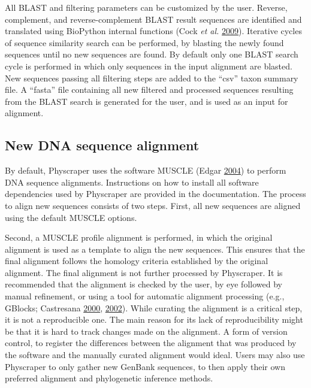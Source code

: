 \documentclass[]{article}
\begin{document}
All BLAST and filtering parameters can be customized by the user.
Reverse, complement, and reverse-complement BLAST result sequences are identified and translated using BioPython internal functions (Cock \emph{et al.} \protect\hyperlink{ref-cock2009biopython}{2009}).
Iterative cycles of sequence similarity search can be performed, by blasting the newly found sequences until no new sequences are found. By default only one BLAST search cycle is performed in which only sequences in the input alignment are blasted.
New sequences passing all filtering steps are added to the ``csv'' taxon summary file.
A ``fasta'' file containing all new filtered and processed sequences resulting from the BLAST search is generated for the user, and is used as an input for alignment.

\hypertarget{new-dna-sequence-alignment}{%
\subsection{New DNA sequence alignment}\label{new-dna-sequence-alignment}}

By default, Physcraper uses the software MUSCLE (Edgar \protect\hyperlink{ref-edgar2004muscle}{2004}) to perform DNA sequence alignments. Instructions on how to install all software dependencies used by Physcraper are provided in the documentation.
The process to align new sequences consists of two steps. First, all new sequences are aligned using the default MUSCLE options.

Second, a MUSCLE profile alignment is performed, in which the original alignment
is used as a template to align the new sequences. This ensures that the final alignment
follows the homology criteria established by the original alignment.
The final alignment is not further processed by Physcraper. It is recommended that the alignment is checked by the user, by eye followed by manual refinement, or using a tool for automatic alignment processing (e.g., GBlocks; Castresana \protect\hyperlink{ref-castresana2000selection}{2000}, \protect\hyperlink{ref-castresana2002gblocks}{2002}).
While curating the alignment is a critical step, it is not a reproducible one. The main reason for its lack of reproducibility might be that it is hard to track changes made on the alignment. A form of version control, to register the differences between the alignment that was produced by the software and the manually curated alignment would ideal.
Users may also use Physcraper to only gather new GenBank sequences, to then apply their own preferred alignment and phylogenetic inference methods.
\end{document}
